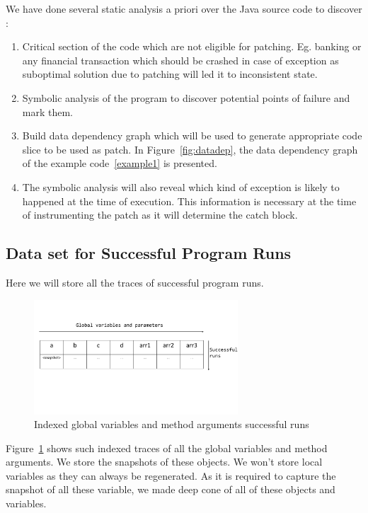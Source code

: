 \documentclass{sigplanconf}
\begin{document}
We have done several  static analysis a priori  over the Java source code to discover :
\begin{enumerate}
	\item Critical section of the code which are not eligible for patching. Eg. banking or any financial transaction which should be crashed in case of 
	exception as suboptimal solution due to patching will led it to inconsistent state.
	\item Symbolic analysis of the program to discover potential points of failure and mark them.
	\item Build data dependency graph which will be used to generate appropriate code slice to be used as patch. 
	In Figure~\ref{fig:datadep}, the data dependency graph of the example code~\ref{example1} is presented.
	\item The symbolic analysis will also reveal which kind of exception is likely to happened at the time of execution. 
	This information is necessary at the time of instrumenting the patch as it will determine the catch block.
	
\end{enumerate}

\subsection{Data set for Successful Program Runs}
\label{subsec:progrun}

Here we will store all the traces of successful program runs.
\begin{figure}[!htb]
\centering
\includegraphics[width=3.0in]{images/succrun.pdf}
\caption{Indexed global variables and method arguments successful runs}
\label{fig:succrun}
\end{figure}

Figure~\ref{fig:succrun} shows such indexed traces of all the global variables and method arguments. 
We store the snapshots of these objects. We won't store local variables as they can always be regenerated. 
As it is required to capture the snapshot of all these variable, we made deep cone of all of these objects and variables. 
\end{document}
